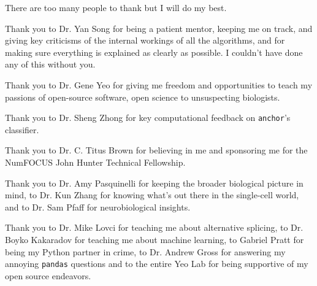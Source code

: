 \begin{frontmatter}
{
\let\oldnumberline\numberline
\renewcommand*{\numberline}[1]{%
  \oldnumberline{\figurename~#1:}}%
\listoffigures  %
}
\listoffigures


%
%
\begin{acknowledgements}

There are too many people to thank but I will do my best. 

Thank you to Dr. Yan Song for being a patient mentor, keeping me on track, and giving key criticisms of the internal workings of all the algorithms, and for making sure everything is explained as clearly as possible. I couldn't have done any of this without you.

Thank you to Dr. Gene Yeo for giving me freedom and opportunities to teach my passions of open-source software, open science to unsuspecting biologists.

Thank you to Dr. Sheng Zhong for key computational feedback on \texttt{anchor}'s classifier.

Thank you to Dr. C. Titus Brown for believing in me and sponsoring me for the NumFOCUS John Hunter Technical Fellowship.

Thank you to Dr. Amy Pasquinelli for keeping the broader biological picture in mind, to Dr. Kun Zhang for knowing what's out there in the single-cell world, and to Dr. Sam Pfaff for neurobiological insights.

Thank you to Dr. Mike Lovci for teaching me about alternative splicing, to Dr. Boyko Kakaradov for teaching me about machine learning, to Gabriel Pratt for being my Python partner in crime, to Dr. Andrew Gross for answering my annoying \texttt{pandas} questions and to the entire Yeo Lab for being supportive of my open source endeavors.



\end{acknowledgements}
\end{frontmatter}
